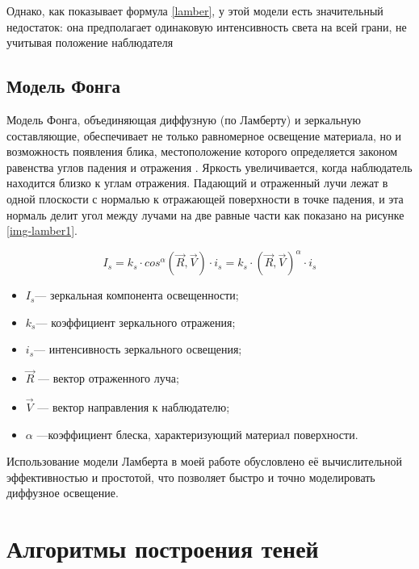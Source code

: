 
Однако, как показывает формула \ref{lamber}, у этой модели есть значительный недостаток: она предполагает одинаковую интенсивность света на всей грани, не учитывая положение наблюдателя


\subsection{Модель Фонга}
 
 Модель Фонга, объединяющая диффузную (по Ламберту) и зеркальную составляющие, обеспечивает не только равномерное освещение материала, но и возможность появления блика, местоположение которого определяется законом равенства углов падения и отражения \cite{lightmodfv}. Яркость увеличивается, когда наблюдатель находится близко к углам отражения. Падающий и отраженный лучи лежат в одной плоскости с нормалью к отражающей поверхности в точке падения, и эта нормаль делит угол между лучами на две равные части как показано на рисунке \ref{img-lamber1}.
 

\begin{equation}
	I_{s}=k_{s} \cdot cos^{\alpha}(\vec R, \vec V) \cdot i_{s} = k_{s} \cdot (\vec R, \vec V)^{\alpha} \cdot i_{s}
\end{equation}

\begin{itemize}
	\item $I_{s}$​ --- зеркальная компонента освещенности;
	\item $k_{s}$​ --- коэффициент зеркального отражения;
	\item $i_{s}$​ --- интенсивность зеркального освещения;
	\item $\vec R$ --- вектор отраженного луча;
	\item $\vec V$ --- вектор направления к наблюдателю;
	\item $\alpha$ ---коэффициент блеска, характеризующий материал поверхности.
\end{itemize}


Использование модели Ламберта в моей работе обусловлено её вычислительной эффективностью и простотой, что позволяет быстро и точно моделировать диффузное освещение.

\section{Алгоритмы построения теней}

